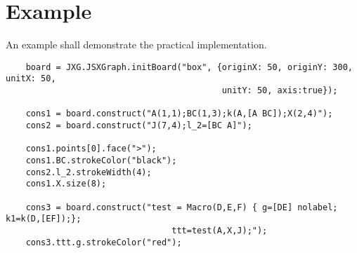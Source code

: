 \documentclass[10pt]{article}
\begin{document}
\section{Example}
An example shall demonstrate the practical implementation.
\begin{verbatim}
    board = JXG.JSXGraph.initBoard("box", {originX: 50, originY: 300, unitX: 50,
                                           unitY: 50, axis:true});

    cons1 = board.construct("A(1,1);BC(1,3);k(A,[A BC]);X(2,4)");
    cons2 = board.construct("J(7,4);l_2=[BC A]");

    cons1.points[0].face(">");
    cons1.BC.strokeColor("black");
    cons2.l_2.strokeWidth(4);
    cons1.X.size(8);

    cons3 = board.construct("test = Macro(D,E,F) { g=[DE] nolabel; k1=k(D,[EF]);};
                                 ttt=test(A,X,J);");
    cons3.ttt.g.strokeColor("red");
\end{verbatim}
\end{document}
